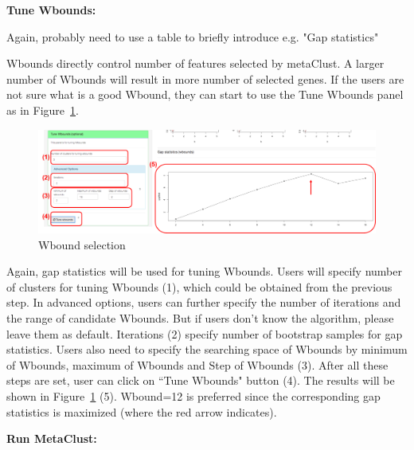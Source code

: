 \begin{steps}
\item \textbf{Tune Wbounds:} 

{
\color{red}
Again, probably need to use a table to briefly introduce e.g. "Gap statistics"
}

Wbounds directly control number of features selected by metaClust.
A larger number of Wbounds will result in more number of selected genes.
If the users are not sure what is a good Wbound,
they can start to use the Tune Wbounds panel as in Figure~\ref{fig:metaClusttuneW}.
\begin{figure}[H]
\begin{center}
\includegraphics[scale=0.5]{./figure/metaClust/tuneW.pdf}
\caption{Wbound selection}
\label{fig:metaClusttuneW}
\end{center}
\end{figure}
Again,
gap statistics will be used for tuning Wbounds.
Users will specify number of clusters for tuning Wbounds {\color{red} (1)}, which could be obtained from the previous step.
In advanced options, users can further specify the number of iterations and the range of candidate Wbounds.
But if users don't know the algorithm, please leave them as default.
Iterations {\color{red} (2)} specify number of bootstrap samples for gap statistics.
Users also need to specify the searching space of Wbounds by minimum of Wbounds, maximum of Wbounds and Step of Wbounds {\color{red} (3)}.
After all these steps are set,
user can click on ``Tune Wbounds" button {\color{red} (4)}.
The results will be shown in Figure~\ref{fig:metaClusttuneW} {\color{red} (5)}.
Wbound=12 is preferred since the corresponding gap statistics is maximized (where the red arrow indicates).

\item \textbf{Run MetaClust:} 


\end{steps}
